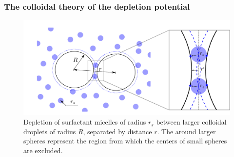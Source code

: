 \subsubsection{The colloidal theory of the depletion potential}
\label{depletion theory}

\begin{figure}[t]

 \centering
 \includegraphics[width=.75\columnwidth]{Figures/depletion3.pdf}
 \caption{Depletion of surfactant micelles of radius $r_s$ between larger colloidal droplets of radius $R$, separated by distance $r$. The  around larger spheres represent the region from which the centers of small spheres are excluded.  }
 \label{fig: overlap}
\end{figure}

